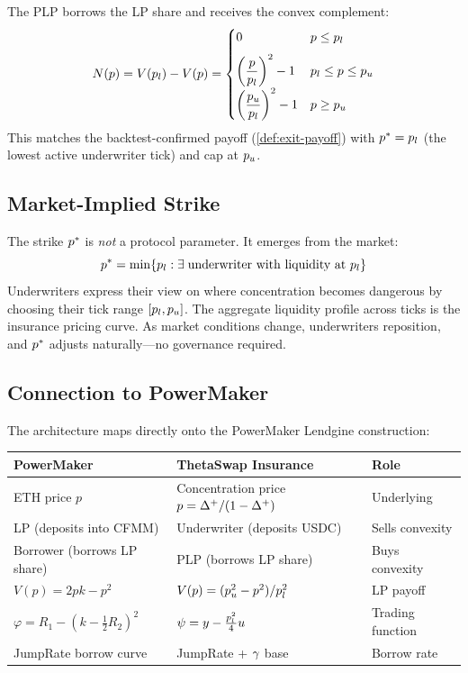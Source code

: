 The PLP borrows the LP share and receives the convex complement:
\begin{equation}\label{eq:plp-payoff}
  N(p) = V(p_l) - V(p) = \begin{cases}
    0                                                    & p \leq p_l \\[6pt]
    \left(\dfrac{p}{p_l}\right)^2 - 1                   & p_l \leq p \leq p_u \\[6pt]
    \left(\dfrac{p_u}{p_l}\right)^2 - 1                 & p \geq p_u
  \end{cases}
\end{equation}
This matches the backtest-confirmed payoff (\cref{def:exit-payoff}) with
$p^{*} = p_l$ (the lowest active underwriter tick) and cap at $p_u$.

\subsection{Market-Implied Strike}

The strike $p^{*}$ is \emph{not} a protocol parameter. It emerges from the market:
\begin{equation}\label{eq:market-strike}
  p^{*} = \min\{p_l : \exists\; \text{underwriter with liquidity at } p_l\}
\end{equation}
Underwriters express their view on where concentration becomes dangerous by
choosing their tick range $[p_l, p_u]$. The aggregate liquidity profile across
ticks is the insurance pricing curve. As market conditions change, underwriters
reposition, and $p^{*}$ adjusts naturally---no governance required.

\subsection{Connection to PowerMaker}

The architecture maps directly onto the PowerMaker \cite{leifke2024powermaker}
Lendgine construction:

\begin{center}
\begin{tabular}{@{}lll@{}}
\toprule
PowerMaker & ThetaSwap Insurance & Role \\
\midrule
ETH price $p$ & Concentration price $p = \Delta^{+}/(1-\Delta^{+})$ & Underlying \\
LP (deposits into CFMM) & Underwriter (deposits USDC) & Sells convexity \\
Borrower (borrows LP share) & PLP (borrows LP share) & Buys convexity \\
$V(p) = 2pk - p^2$ & $V(p) = (p_u^2 - p^2)/p_l^2$ & LP payoff \\
$\varphi = R_1 - (k - \tfrac{1}{2}R_2)^2$ & $\psi = y - \tfrac{p_l^2}{4}u$ & Trading function \\
JumpRate borrow curve & JumpRate + $\gamma$ base & Borrow rate \\
\bottomrule
\end{tabular}
\end{center}
